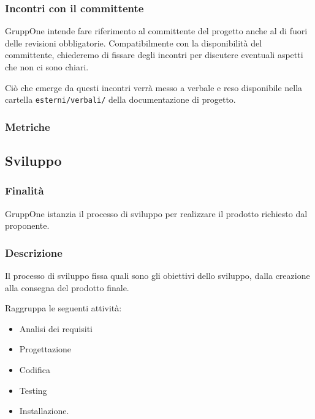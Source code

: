 \documentclass[../norme-di-progetto.tex]{subfiles}
\begin{document}
\subsubsection{Incontri con il committente}

GruppOne intende fare riferimento al committente del progetto anche al di fuori delle revisioni obbligatorie.
Compatibilmente con la disponibilità del committente, chiederemo di fissare degli incontri per discutere eventuali aspetti che non ci sono chiari.

Ciò che emerge da questi incontri verrà messo a verbale e reso disponibile nella cartella \verb|esterni/verbali/| della documentazione di progetto.

\subsubsection{Metriche}%
\label{subs:fornitura/metriche}



\subsection{Sviluppo}%
\label{sub:sviluppo}

\subsubsection{Finalità}%
\label{subs:sviluppo/finalita}

GruppOne istanzia il processo di sviluppo per realizzare il prodotto richiesto dal proponente.

\subsubsection{Descrizione}%
\label{subs:sviluppo/descrizione}

Il processo di sviluppo fissa quali sono gli obiettivi dello sviluppo, dalla creazione alla consegna del prodotto finale.

Raggruppa le seguenti attività:
\begin{itemize}
  \item Analisi dei requisiti
  \item Progettazione
  \item Codifica
  \item Testing
  \item Installazione.
\end{itemize}
\end{document}
